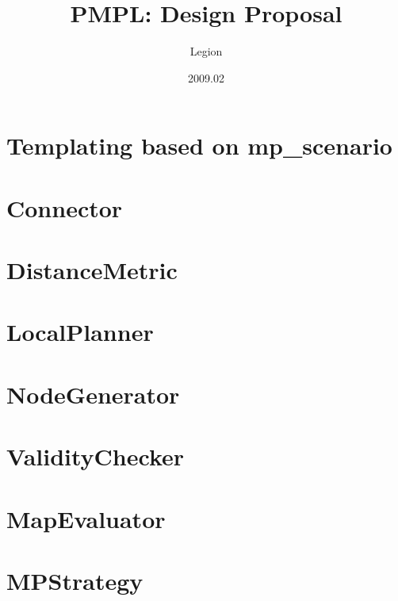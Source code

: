 \documentclass[11pt]{article}
\title{PMPL: Design Proposal}
\author{Legion}
\date{2009.02}                                           %
\begin{document}
\maketitle
\tableofcontents
\newpage
\lstset{style=C++}


\section{Templating based on mp\_scenario}


\newpage
\section{Connector}


\newpage
\section{DistanceMetric}


\newpage
\section{LocalPlanner}


\newpage
\section{NodeGenerator}


\newpage
\section{ValidityChecker}


\newpage
\section{MapEvaluator}

%
%

\newpage
\section{MPStrategy}

%
\end{document}
